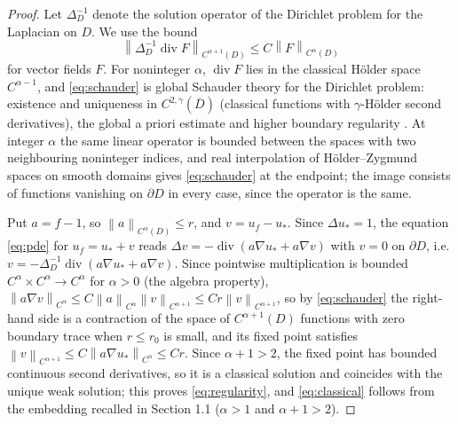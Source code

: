 \documentclass[12pt]{article}
\numberwithin{equation}{section}
\newcommand{\norm}[1]{\left\|#1\right\|}
\newcommand{\diver}{\operatorname{div}}
\begin{document}
\begin{proof}
Let $\Delta_D^{-1}$ denote the solution operator of the Dirichlet
problem for the Laplacian on $D$. We use the bound
\begin{equation}\label{eq:schauder}
 \norm{\Delta_D^{-1}\diver F}_{C^{\alpha+1}(D)}\le C\norm F_{C^\alpha(D)}
\end{equation}
for vector fields $F$. For noninteger $\alpha$, $\diver F$ lies in the
classical H\"older space $C^{\alpha-1}$, and \eqref{eq:schauder} is
global Schauder theory for the Dirichlet problem: existence and
uniqueness in $C^{2,\gamma}(\overline D)$ (classical functions with
$\gamma$-H\"older second derivatives), the global a priori estimate
and higher boundary regularity \cite[Theorems 6.14, 6.6 and 6.19]{GT}.
At integer $\alpha$ the same linear operator is bounded between the
spaces with two neighbouring noninteger indices, and real interpolation
of H\"older--Zygmund spaces on smooth domains
\cite[Sections 1.6, 4.5 and 5.1--5.2]{Triebel} gives
\eqref{eq:schauder} at the endpoint; the image consists of functions
vanishing on $\partial D$ in every case, since the operator is the same.

Put $a=f-1$, so $\norm a_{C^\alpha(D)}\le r$, and $v=u_f-u_*$. Since
$\Delta u_*=1$, the equation \eqref{eq:pde} for $u_f=u_*+v$ reads
$\Delta v=-\diver(a\nabla u_*+a\nabla v)$ with $v=0$ on $\partial D$,
i.e. $v=-\Delta_D^{-1}\diver(a\nabla u_*+a\nabla v)$. Since pointwise
multiplication is bounded $C^\alpha\times C^\alpha\to C^\alpha$ for
$\alpha>0$ (the algebra property),
$\norm{a\nabla v}_{C^\alpha}\le C\norm a_{C^\alpha}\norm{v}_{C^{\alpha+1}}
\le Cr\norm v_{C^{\alpha+1}}$, so by \eqref{eq:schauder} the right-hand
side is a contraction of the space of $C^{\alpha+1}(D)$ functions with
zero boundary trace when $r\le r_0$ is small, and its fixed point
satisfies $\norm v_{C^{\alpha+1}}\le C\norm{a\nabla u_*}_{C^\alpha}\le
Cr$. Since $\alpha+1>2$, the fixed point has bounded continuous second
derivatives, so it is a classical solution and coincides with the
unique weak solution; this proves
\eqref{eq:regularity}, and \eqref{eq:classical} follows from the
embedding recalled in Section 1.1 ($\alpha>1$ and $\alpha+1>2$).
\end{proof}
\end{document}
